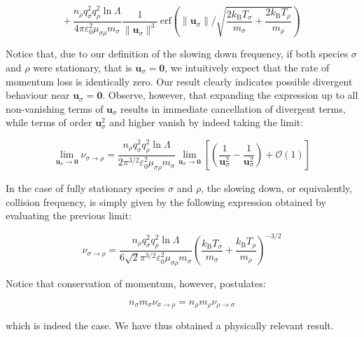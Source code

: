 \begin{equation}
    \label{eq-1-140}
    +\,\frac{n_\rho q_\sigma^2q_\rho^2\ln{\Lambda}}{4\pi\varepsilon_0^2\mu_{\sigma\rho}m_\sigma}\frac{1}{\|\mathbf{u}_\sigma\|^3}\,\text{erf}\left(\|\mathbf{u}_\sigma\|\bigg/\sqrt{\frac{2k_\mathrm{B}T_\sigma}{m_\sigma}+\frac{2k_\mathrm{B}T_\rho}{m_\rho}}\right)
\end{equation}

Notice that, due to our definition of the slowing down frequency, if both species $\sigma$ and $\rho$ were stationary, that is $\mathbf{u}_\sigma=\mathbf{0}$, we intuitively expect that the rate of momentum loss is identically zero. Our result clearly indicates possible divergent behaviour near $\mathbf{u}_\sigma=\mathbf{0}$. Observe, however, that expanding the expression up to all non-vanishing terms of $\mathbf{u}_\sigma$ results in immediate cancellation of divergent terms, while terms of order $\mathbf{u}_\sigma^2$ and higher vanish by indeed taking the limit:

\begin{equation}
    \lim_{\mathbf{u}_\sigma\to\mathbf{0}}\nu_{\sigma\to\rho}=\frac{n_\rho q_\sigma^2q_\rho^2\ln{\Lambda}}{2\pi^{3/2}\varepsilon_0^2\mu_{\sigma\rho}m_\sigma}\lim_{\mathbf{u}_\sigma\to\mathbf{0}}\left[\left(\frac{1}{\mathbf{u}_\sigma^2}-\frac{1}{\mathbf{u}_\sigma^2}\right)+\mathcal{O}(1)\right]
\end{equation}

In the case of fully stationary species $\sigma$ and $\rho$, the slowing down, or equivalently, collision frequency, is simply given by the following expression obtained by evaluating the previous limit:

\begin{equation}
    \label{eq-1-143}
    \nu_{\sigma\to\rho}=\frac{n_\rho q_\sigma^2q_\rho^2\ln{\Lambda}}{6\sqrt{2}\pi^{3/2}\varepsilon_0^2\mu_{\sigma\rho}m_\sigma}\left(\frac{k_\mathrm{B}T_\sigma}{m_\sigma}+\frac{k_\mathrm{B}T_\rho}{m_\rho}\right)^{-3/2}
\end{equation}

Notice that conservation of momentum, however, postulates:

\begin{equation}
    \label{eq-1-144}
    n_\sigma m_\sigma\nu_{\sigma\to\rho}=n_\rho m_\rho\nu_{\rho\to\sigma}
\end{equation}

which is indeed the case. We have thus obtained a physically relevant result.

